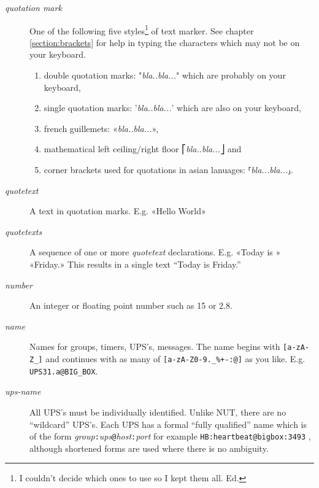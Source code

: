 \documentclass[12pt]{article}
\newcommand{\ol}{\begin{enumerate}%
   \setlength{\itemsep}{0em}}
\newcommand{\eol}{\end{enumerate}}
\newcommand{\li}{\item}                 %
\begin{document}
\begin{description}

\item[\textit{quotation mark}] \hspace{7mm} One of the following five
  styles\footnote{I couldn't decide which ones to use so I kept them all. Ed.}
  of text marker.  See chapter \ref{section:brackets} for help in typing the
  characters which may not be on your keyboard.

\ol

\li double quotation marks: "\textit{bla..bla...}" which are probably on your
keyboard,

\li single quotation marks: '\textit{bla..bla...}'  which are also on your
keyboard,

\li french guillemets: «\textit{bla..bla...}»,

\li mathematical left ceiling/right floor ⎡\textit{bla..bla...}⎦ and 

\li corner brackets used for quotations in asian lanuages:
⸢\textit{bla...bla...}⸥.

\eol

\item[\textit{quotetext}] \hspace{7mm} A text in quotation marks.  E.g. «Hello
  World»

\item[\textit{quotetexts}] \hspace{7mm} A sequence of one or more
  \textit{quotetext} declarations.  E.g. «Today is » «Friday.» This results in
  a single text ``Today is Friday.''

\item[\textit{number}] \hspace{7mm} An integer or floating point number such
  as 15 or 2.8.

\item[\textit{name}] \hspace{7mm} Names for groups, timers, UPS's, messages.
  The name begins with \texttt{[a-zA-Z\_]} and continues with as many of
  \texttt{[a-zA-Z0-9.\_\%+-:@]} as you like.  E.g. \texttt{UPS31.a@BIG\_BOX}.

\item[\textit{ups-name}] \hspace{7mm} All UPS's must be individually
  identified.  Unlike NUT, there are no ``wildcard'' UPS's.  Each UPS has a
  formal ``fully qualified'' name which is of the form
  \textit{group}\texttt{:}\textit{ups}\texttt{@}\textit{host}\texttt{:}\textit{port}
  for example \texttt{HB:heartbeat@bigbox:3493} , although shortened forms are
  used where there is no ambiguity.

\end{description}
\end{document}
